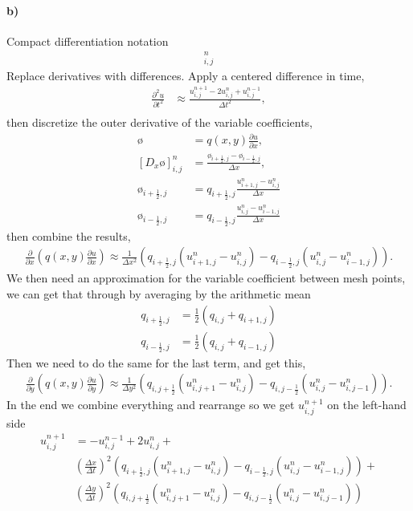 \documentclass[11pt,a4paper]{article}
\begin{document}
\paragraph*{b)}
Compact differentiation notation
\begin{align}
[D_tD_tu=D_x\overline{q}^xD_xu+D_y\overline{q}^yD_yu]^n_{i,j}
\end{align}
Replace derivatives with differences. Apply a centered difference in time,
\begin{align}
\frac{\partial^2 u}{\partial t^2} &\approx \frac{u^{n+1}_{i,j}-2u^{n}_{i,j}+u^{n-1}_{i,j}}{\Delta t^2}, \\
\end{align}
then discretize the outer derivative of the variable coefficients,
\begin{align}
ø &= q(x,y)\frac{\partial u}{\partial x}, \\
[D_xø]^n_{i,j} &= \frac{ø_{i+\frac{1}{2},j}-ø_{i-\frac{1}{2},j}}{\Delta x}, \\
ø_{i+\frac{1}{2},j} &= q_{i+\frac{1}{2},j}\frac{u^n_{i+1,j}-u^n_{i,j}}{\Delta x}\\
ø_{i-\frac{1}{2},j} &= q_{i-\frac{1}{2},j}\frac{u^n_{i,j}-u^n_{i-1,j}}{\Delta x}
\end{align}
then combine the results,
\begin{align}
\frac{\partial}{\partial x}\left(q(x,y)\frac{\partial u}{\partial x}\right) \approx \frac{1}{\Delta x^2}\left(q_{i+\frac{1}{2},j}(u^n_{i+1,j}-u^n_{i,j})-q_{i-\frac{1}{2},j}(u^n_{i,j}-u^n_{i-1,j})\right).
\end{align}
We then need an approximation for the variable coefficient between mesh points, we can get that through by averaging by the arithmetic mean
\begin{align*}
q_{i+\frac{1}{2},j} &= \frac{1}{2}(q_{i,j}+q_{i+1,j})\\
q_{i-\frac{1}{2},j} &= \frac{1}{2}(q_{i,j}+q_{i-1,j})
\end{align*}
Then we need to do the same for the last term, and get this,
\begin{align}
\frac{\partial}{\partial y}\left(q(x,y)\frac{\partial u}{\partial y}\right) \approx \frac{1}{\Delta y^2}\left(q_{i,j+\frac{1}{2}}(u^n_{i,j+1}-u^n_{i,j})-q_{i,j-\frac{1}{2}}(u^n_{i,j}-u^n_{i,j-1})\right).
\end{align}
In the end we combine everything and rearrange so we get $u^{n+1}_{i,j}$ on the left-hand side
\begin{align}
u^{n+1}_{i,j} &= -u^{n-1}_{i,j} + 2u^{n}_{i,j} + \\
& \left(\frac{\Delta x}{\Delta t} \right)^2 \left(q_{i+\frac{1}{2},j}(u^n_{i+1,j}-u^n_{i,j})-q_{i-\frac{1}{2},j}(u^n_{i,j}-u^n_{i-1,j})\right)+ \\
& \left(\frac{\Delta y}{\Delta t} \right)^2\left(q_{i,j+\frac{1}{2}}(u^n_{i,j+1}-u^n_{i,j})-q_{i,j-\frac{1}{2}}(u^n_{i,j}-u^n_{i,j-1})\right)
\end{align}
\end{document}
